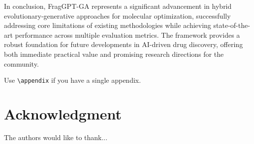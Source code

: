\documentclass[lettersize,journal]{IEEEtran}
\begin{document}
In conclusion, FragGPT-GA represents a significant advancement in hybrid evolutionary-generative approaches for molecular optimization, successfully addressing core limitations of existing methodologies while achieving state-of-the-art performance across multiple evaluation metrics. The framework provides a robust foundation for future developments in AI-driven drug discovery, offering both immediate practical value and promising research directions for the community.


Use \verb|\appendix| if you have a single appendix.

\section*{Acknowledgment}
The authors would like to thank...

\balance

\nocite{*} %


\end{document}
